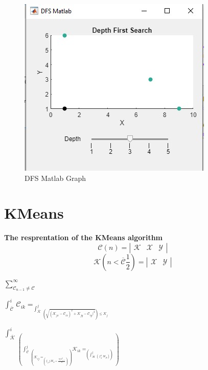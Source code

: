 \documentclass[conference]{IEEEtran}
\begin{document}
      \begin{figure}[ht]
        \centering
        \includegraphics[width=0.65\columnwidth]{Figures/fig3.jpg}
        \caption{DFS Matlab Graph}
        \label{fig:dfsMatlabGraph}
      \end{figure}

    \section{KMeans}
      \begin{center}
        \textbf{The resprentation of the KMeans algorithm}
        \[ \mathcal{C}(n) = \left| 
        \begin{array}{ccc}
          \mathcal{K} & \mathcal{X} & \mathcal{Y}
        \end{array} \right|
        \]
        \[ \mathcal{K}(n \mathcal{<} \overline{\mathcal{C}}\frac{1}{2}) = \left| \begin{array}{cc}
          \mathcal{X} & \mathcal{Y}
          \end{array} \right|
        \] 

        $\sum_{\mathcal{C}_{n-1} \neq \mathcal{C}}^{\infty}$

        $\int_{\overline{\mathcal{C}}}^{i} \, \mathcal{C}_{ik}=
            _{\int_{\overline{\mathcal{K}}}^{j}  \,
              _{\left(\sqrt{(\mathcal{K}_{j x} - \mathcal{C}_{i x})^2 + \mathcal{K}_{j y} - \mathcal{C}_{iy})^2 }
              \right) \leq \mathcal{K}_{j}}}$

        $\int_{\overline{\mathcal{K}}}^{i} \,
        _{\left(\int_{\overline{\mathcal{C}}}^{j} \,
        _{\left(
          \mathcal{K}_{ij} =
         _{\left(\int_{2}{j} \, 
         \overline{\mathcal{M}_k} = \frac{\sum \mathcal{C}_{j \equiv i}^k}{n} 
         \right)}
        \right)}
        \mathcal{K}_{ik} =
        _{\left(\int_{\overline{\mathcal{M}}}^{j} \, 
          _{\left(\int_{2}^{k} \, 
            \mathcal{M}_{jk}
          \right)}
          \right)}
        \right)}$
        
      \end{center}
\end{document}
